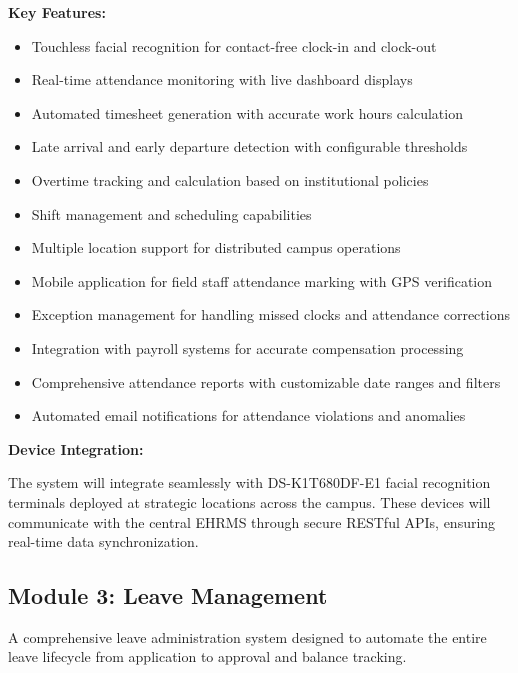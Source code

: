 \documentclass[12pt]{article}
\begin{document}
\textbf{Key Features:}
\begin{itemize}[noitemsep]
\item Touchless facial recognition for contact-free clock-in and clock-out
\item Real-time attendance monitoring with live dashboard displays
\item Automated timesheet generation with accurate work hours calculation
\item Late arrival and early departure detection with configurable thresholds
\item Overtime tracking and calculation based on institutional policies
\item Shift management and scheduling capabilities
\item Multiple location support for distributed campus operations
\item Mobile application for field staff attendance marking with GPS verification
\item Exception management for handling missed clocks and attendance corrections
\item Integration with payroll systems for accurate compensation processing
\item Comprehensive attendance reports with customizable date ranges and filters
\item Automated email notifications for attendance violations and anomalies
\end{itemize}

\textbf{Device Integration:}

The system will integrate seamlessly with DS-K1T680DF-E1 facial recognition terminals deployed at strategic locations across the campus. These devices will communicate with the central EHRMS through secure RESTful APIs, ensuring real-time data synchronization.

\subsection{Module 3: Leave Management}

A comprehensive leave administration system designed to automate the entire leave lifecycle from application to approval and balance tracking.
\end{document}
